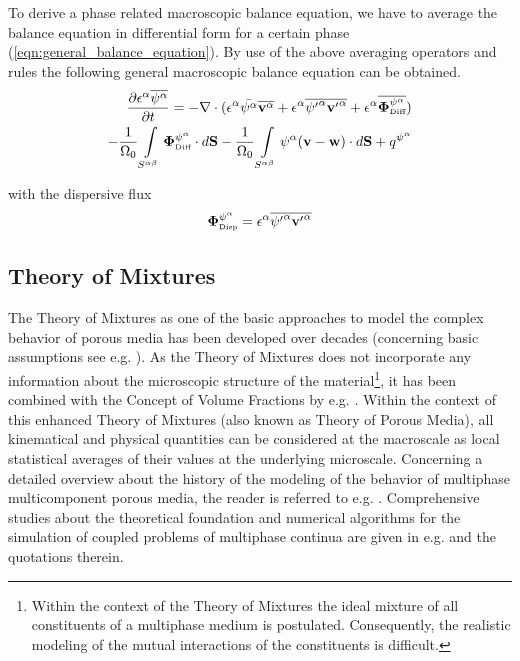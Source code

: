To derive a phase related macroscopic balance equation,
we have to average the balance equation in differential form
for a certain phase (\ref{eqn:general_balance_equation}).
By use of the above averaging operators and rules
the following general macroscopic balance equation
can be obtained.
%
\begin{eqnarray}
\frac{\partial \epsilon^\alpha \overline{\psi^\alpha}}{\partial t}
=
-
\nabla\cdot(
\epsilon^\alpha\bar{\psi^\alpha}\overline{{\bf v}^\alpha}
+
\epsilon^\alpha\overline{{\psi'}^\alpha{\bf v'}^\alpha}
+
\epsilon^\alpha\overline{{\bf\Phi}_{\textrm{\tiny Diff}}^{\psi^\alpha}}
)
\nonumber \\
-
\frac{1}{\Omega_0}
\int\limits_{S^{\alpha\beta}} {\bf\Phi}_{\textrm{\tiny Diff}}^{\psi^\alpha} \cdot d{\bf S}
-
\frac{1}{\Omega_0}
\int\limits_{S^{\alpha\beta}}\psi^\alpha ({\bf v-w}) \cdot d{\bf S}
+
q^{\psi^\alpha}
\end{eqnarray}

with the dispersive flux
\begin{eqnarray}
{\bf\Phi}_{\textrm{\tiny Disp}}^{\psi^\alpha}
=
\epsilon^\alpha\overline{{\psi'}^\alpha{\bf v'}^\alpha}
\end{eqnarray}

\subsection{Theory of Mixtures}
\label{sec:mixtures}

The Theory of Mixtures as one of the basic approaches to model the complex behavior of porous media has been developed over decades (concerning basic assumptions see e.g. \cite{Bow:1976,TT:1960}). As the Theory of Mixtures does not incorporate any information about the microscopic structure of the material\footnote{Within the context of the Theory of Mixtures the ideal mixture of all constituents of a multiphase medium is postulated. Consequently, the realistic modeling of the mutual interactions of the constituents is difficult.}, it has been combined with the Concept of Volume Fractions by e.g. \cite{Bow:1980,BE:1986a,LewSch:98,Pre:1980}. Within the context of this enhanced Theory of Mixtures (also known as Theory of Porous Media), all kinematical and physical quantities can be considered at the macroscale as local statistical averages of their values at the underlying microscale.
%
Concerning a detailed overview about the history of the modeling of the behavior of multiphase multicomponent porous media, the reader is referred to e.g. \cite{Boe:00}. Comprehensive studies about the theoretical foundation and numerical algorithms for the simulation of coupled problems of multiphase continua are given in e.g. \cite{Boe:00,EB:2002,LewSch:98} and the quotations therein. 

